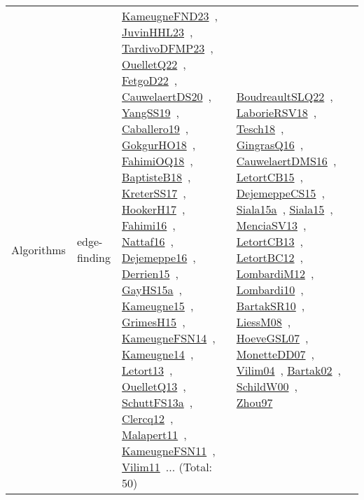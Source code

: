 {\begin{longtable}{lp{3cm}>{\raggedright\arraybackslash}p{6cm}>{\raggedright\arraybackslash}p{6cm}>{\raggedright\arraybackslash}p{8cm}}
Algorithms & edge-finding & \href{../works/KameugneFND23.pdf}{KameugneFND23}~\cite{KameugneFND23}, \href{../works/JuvinHHL23.pdf}{JuvinHHL23}~\cite{JuvinHHL23}, \href{../works/TardivoDFMP23.pdf}{TardivoDFMP23}~\cite{TardivoDFMP23}, \href{../works/OuelletQ22.pdf}{OuelletQ22}~\cite{OuelletQ22}, \href{../works/FetgoD22.pdf}{FetgoD22}~\cite{FetgoD22}, \href{../works/CauwelaertDS20.pdf}{CauwelaertDS20}~\cite{CauwelaertDS20}, \href{../works/YangSS19.pdf}{YangSS19}~\cite{YangSS19}, \href{../works/Caballero19.pdf}{Caballero19}~\cite{Caballero19}, \href{../works/GokgurHO18.pdf}{GokgurHO18}~\cite{GokgurHO18}, \href{../works/FahimiOQ18.pdf}{FahimiOQ18}~\cite{FahimiOQ18}, \href{../works/BaptisteB18.pdf}{BaptisteB18}~\cite{BaptisteB18}, \href{../works/KreterSS17.pdf}{KreterSS17}~\cite{KreterSS17}, \href{../works/HookerH17.pdf}{HookerH17}~\cite{HookerH17}, \href{../works/Fahimi16.pdf}{Fahimi16}~\cite{Fahimi16}, \href{../works/Nattaf16.pdf}{Nattaf16}~\cite{Nattaf16}, \href{../works/Dejemeppe16.pdf}{Dejemeppe16}~\cite{Dejemeppe16}, \href{../works/Derrien15.pdf}{Derrien15}~\cite{Derrien15}, \href{../works/GayHS15a.pdf}{GayHS15a}~\cite{GayHS15a}, \href{../works/Kameugne15.pdf}{Kameugne15}~\cite{Kameugne15}, \href{../works/GrimesH15.pdf}{GrimesH15}~\cite{GrimesH15}, \href{../works/KameugneFSN14.pdf}{KameugneFSN14}~\cite{KameugneFSN14}, \href{../works/Kameugne14.pdf}{Kameugne14}~\cite{Kameugne14}, \href{../works/Letort13.pdf}{Letort13}~\cite{Letort13}, \href{../works/OuelletQ13.pdf}{OuelletQ13}~\cite{OuelletQ13}, \href{../works/SchuttFS13a.pdf}{SchuttFS13a}~\cite{SchuttFS13a}, \href{../works/Clercq12.pdf}{Clercq12}~\cite{Clercq12}, \href{../works/Malapert11.pdf}{Malapert11}~\cite{Malapert11}, \href{../works/KameugneFSN11.pdf}{KameugneFSN11}~\cite{KameugneFSN11}, \href{../works/Vilim11.pdf}{Vilim11}~\cite{Vilim11}... (Total: 50) & \href{../works/BoudreaultSLQ22.pdf}{BoudreaultSLQ22}~\cite{BoudreaultSLQ22}, \href{../works/LaborieRSV18.pdf}{LaborieRSV18}~\cite{LaborieRSV18}, \href{../works/Tesch18.pdf}{Tesch18}~\cite{Tesch18}, \href{../works/GingrasQ16.pdf}{GingrasQ16}~\cite{GingrasQ16}, \href{../works/CauwelaertDMS16.pdf}{CauwelaertDMS16}~\cite{CauwelaertDMS16}, \href{../works/LetortCB15.pdf}{LetortCB15}~\cite{LetortCB15}, \href{../works/DejemeppeCS15.pdf}{DejemeppeCS15}~\cite{DejemeppeCS15}, \href{../works/Siala15a.pdf}{Siala15a}~\cite{Siala15a}, \href{../works/Siala15.pdf}{Siala15}~\cite{Siala15}, \href{../works/MenciaSV13.pdf}{MenciaSV13}~\cite{MenciaSV13}, \href{../works/LetortCB13.pdf}{LetortCB13}~\cite{LetortCB13}, \href{../works/LetortBC12.pdf}{LetortBC12}~\cite{LetortBC12}, \href{../works/LombardiM12.pdf}{LombardiM12}~\cite{LombardiM12}, \href{../works/Lombardi10.pdf}{Lombardi10}~\cite{Lombardi10}, \href{../works/BartakSR10.pdf}{BartakSR10}~\cite{BartakSR10}, \href{../works/LiessM08.pdf}{LiessM08}~\cite{LiessM08}, \href{../works/HoeveGSL07.pdf}{HoeveGSL07}~\cite{HoeveGSL07}, \href{../works/MonetteDD07.pdf}{MonetteDD07}~\cite{MonetteDD07}, \href{../works/Vilim04.pdf}{Vilim04}~\cite{Vilim04}, \href{../works/Bartak02.pdf}{Bartak02}~\cite{Bartak02}, \href{../works/SchildW00.pdf}{SchildW00}~\cite{SchildW00}, \href{../works/Zhou97.pdf}{Zhou97}~\cite{Zhou97} & 
\end{longtable}}
